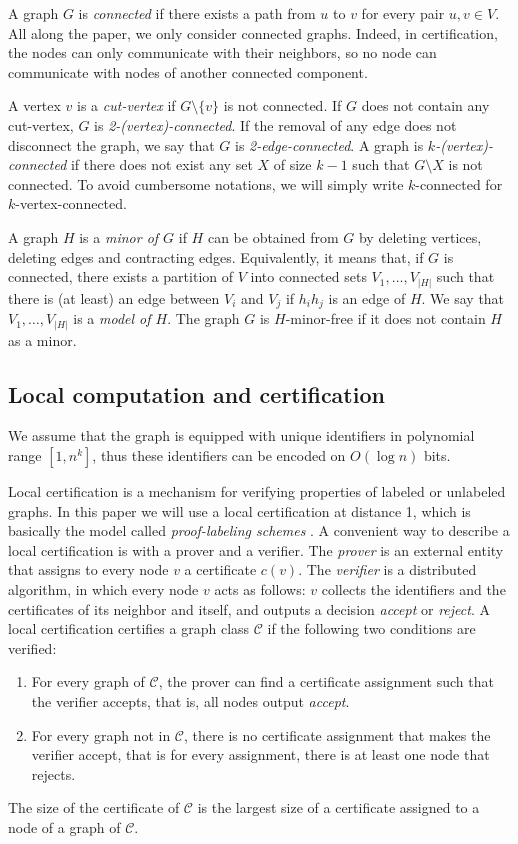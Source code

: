 \documentclass[a4paper,thm-restate,USenglish]{lipics-v2019}
\begin{document}
A graph $G$ is \emph{connected} if there exists a path from $u$ to $v$ for every pair $u,v \in V$. All along the paper, we only consider connected graphs. Indeed, in certification, the nodes can only communicate with their neighbors, so no node can communicate with nodes of another connected component. 

A vertex $v$ is a \emph{cut-vertex} if $G \setminus \{ v \}$ is not connected. If $G$ does not contain any cut-vertex, $G$ is \emph{2-(vertex)-connected}. If the removal of any edge does not disconnect the graph, we say that $G$ is \emph{2-edge-connected}. A graph is \emph{$k$-(vertex)-connected} if there does not exist any set $X$ of size $k-1$ such that $G \setminus X$ is not connected. To avoid cumbersome notations, we will simply write $k$-connected for $k$-vertex-connected.

A graph $H$ is a \emph{minor of $G$} if $H$ can be obtained from $G$ by deleting vertices, deleting edges and contracting edges. Equivalently, it means that, if $G$ is connected, there exists a partition of $V$ into connected sets $V_1,\ldots,V_{|H|}$ such that there is (at least) an edge between $V_i$ and $V_j$ if $h_ih_j$ is an edge of $H$. We say that $V_1,\ldots,V_{|H|}$ is a \emph{model of $H$}. The graph $G$ is $H$-minor-free if it does not contain $H$ as a minor.


\subsection{Local computation and certification}
We assume that the graph is equipped with unique identifiers in polynomial range $[1, n^k]$, thus these identifiers can be encoded on $O(\log n)$ bits.

Local certification is a mechanism for verifying properties of labeled or unlabeled graphs. In this paper we will use a local certification at distance 1, which is basically the model called \emph{proof-labeling  schemes} \cite{KormanKP10}. 
A convenient way to describe a local certification is with a prover and a verifier. 
The \emph{prover} is an external entity that assigns to every node $v$ a certificate $c(v)$.  The \emph{verifier} is a distributed algorithm, in which every node $v$ acts as follows: $v$ collects the identifiers and the certificates of its neighbor and itself, and outputs a decision \emph{accept} or \emph{reject}. 
A local certification certifies a graph class $\mathcal{C}$ if the following two conditions are verified:
\begin{enumerate}
    \item For every graph of $\mathcal{C}$, the prover can find a certificate assignment such that the verifier accepts, that is, all nodes output \emph{accept}.
    \item For every graph not in $\mathcal{C}$, there is no certificate assignment that makes the verifier accept, that is for every assignment, there is at least one node that rejects.
\end{enumerate}
The size of the certificate of $\mathcal{C}$ is the largest size of a certificate assigned to a node of a graph of $\mathcal{C}$. 
\end{document}
